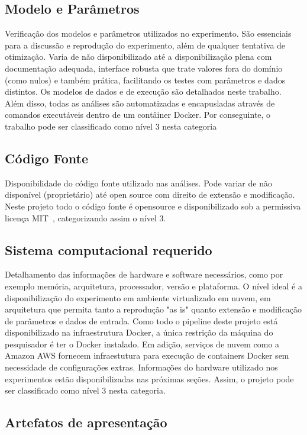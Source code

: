 \documentclass[12pt,openany,oneside,a4paper,english,brazil]{abntbibufjf}
\begin{document}
    \subsection{Modelo e Parâmetros} Verificação dos modelos e parâmetros utilizados no experimento. São essenciais para a discussão e reprodução do experimento, além de qualquer tentativa de otimização. Varia de não disponibilizado até a disponibilização plena com documentação adequada, interface robusta que trate valores fora do domínio (como nulos) e também prática, facilitando os testes com parâmetros e dados distintos. Os modelos de dados e de execução são detalhados neste trabalho. Além disso, todas as análises são automatizadas e encapusladas através de comandos executáveis dentro de um contâiner Docker. Por conseguinte, o trabalho pode ser classificado como nível 3 nesta categoria

    \subsection{Código Fonte} Disponibilidade do código fonte utilizado nas análises. Pode variar de não disponível (proprietário) até open source com direito de extensão e modificação. Neste projeto todo o código fonte é opensource e disponibilizado sob a permissiva licença MIT~\cite{mit}, categorizando assim o nível 3.

    \subsection{Sistema computacional requerido} Detalhamento das informações de hardware e software necessários, como por exemplo memória, arquitetura, processador, versão e plataforma. O nível ideal é a disponibilização do experimento em ambiente virtualizado em nuvem, em arquitetura que permita tanto a reprodução "as is" quanto extensão e modificação de parâmetros e dados de entrada. Como todo o pipeline deste projeto está disponibilizado na infraestrutura Docker, a única restrição da máquina do pesquisador é ter o Docker instalado. Em adição, serviços de nuvem como a Amazon AWS fornecem infraestutura para execução de containers Docker sem necessidade de configurações extras. Informações do hardware utilizado nos experimentos estão disponibilizadas nas próximas seções. Assim, o projeto pode ser classificado como nível 3 nesta categoria.

    \subsection{Artefatos de apresentação}
\end{document}
